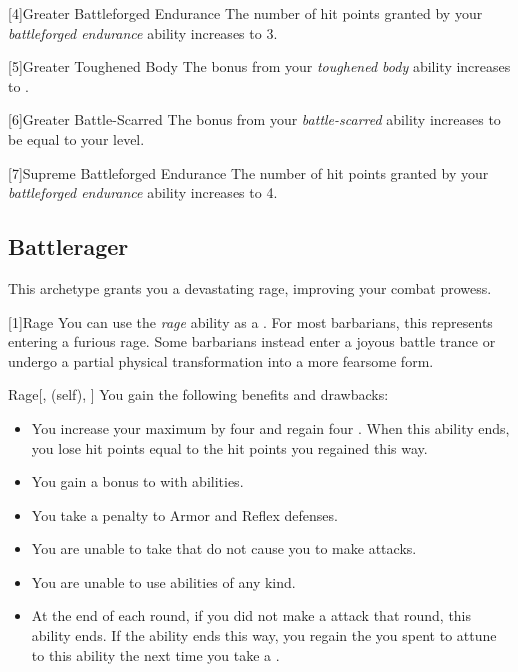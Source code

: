         [4]{Greater Battleforged Endurance} The number of hit points granted by your \textit{battleforged endurance} ability increases to 3.

        [5]{Greater Toughened Body} The bonus from your \textit{toughened body} ability increases to .

        [6]{Greater Battle-Scarred}
        The bonus from your \textit{battle-scarred} ability increases to be equal to your level.

        [7]{Supreme Battleforged Endurance} The number of hit points granted by your \textit{battleforged endurance} ability increases to 4.

    \subsection{Battlerager}\label{Rage}
        This archetype grants you a devastating rage, improving your combat prowess.

        [1]{Rage} You can use the \textit{rage} ability as a .
        For most barbarians, this represents entering a furious rage.
        Some barbarians instead enter a joyous battle trance or undergo a partial physical transformation into a more fearsome form.
        \begin{attuneability}{Rage}[,  (self), ]
            You gain the following benefits and drawbacks:
            \begin{itemize}
                \item You increase your maximum  by four and regain four .
                    When this ability ends, you lose hit points equal to the hit points you regained this way.
                \item You gain a  bonus to  with  abilities.
                \item You take a  penalty to Armor and Reflex defenses.
                \item You are unable to take  that do not cause you to make  attacks.
                \item You are unable to use  abilities of any kind.
                \item At the end of each round, if you did not make a  attack that round, this ability ends.
                    If the ability ends this way, you regain the  you spent to attune to this ability the next time you take a .
            \end{itemize}
        \end{attuneability}

